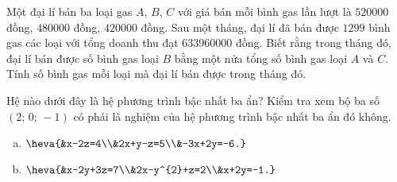 \begin{bt}
	Một đại lí bán ba loại gas $A$, $B$, $C$ với giá bán mỗi bình gas lần lượt là $520000$ đồng, $480000$ đồng, $420000$ đồng. Sau một tháng, đại lí đã bán được $1299$ bình gas các loại với tổng doanh thu đạt $633960000$ đồng. Biết rằng trong tháng đó, đại lí bán được số bình gas loại $B$ bằng một nửa tổng số bình gas loại $A$ và $C$. Tính số bình gas mỗi loại mà đại lí bán được trong tháng đó.
\end{bt}




\begin{bt}
	Hệ nào dưới đây là hệ phương trình bậc nhất ba ẩn? Kiểm tra xem bộ ba số $(2;\,0;\,-1)$ có phải là nghiệm của hệ phương trình bậc nhất ba ẩn đó không.
	\begin{enumerate}[a)]
		\item $\heva{&x-2z=4\\&2x+y-z=5\\&-3x+2y=-6.}$
		\item $\heva{&x-2y+3z=7\\&2x-y^{2}+z=2\\&x+2y=-1.}$
	\end{enumerate}
\end{bt}

